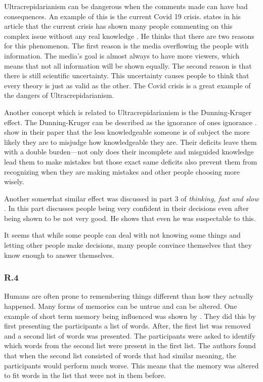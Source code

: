 \documentclass[]{article}
\begin{document}
Ultracrepidarianism can be dangerous when the comments made can have bad consequences.
An example of this is the current Covid 19 crisis. \citeauthor[]{Villain2020} 
states in his article that the current crisis has shown many people commenting 
on this complex issue without any real knowledge \cite{Villain2020}. He thinks 
that there are two reasons for this phenomenon. The first reason is the media
overflowing the people with information. The media's goal is almost always to 
have more viewers, which means that not all information will be shown equally.
The second reason is that there is still scientific uncertainty. This uncertainty
causes people to think that every theory is just as valid as the other. The 
Covid crisis is a great example of the dangers of Ultracrepidarianism.

Another concept which is related to Ultracrepidarianism is the Dunning-Kruger
effect. The Dunning-Kruger can be described as the ignorance of ones 
ignorance \cite{DUNNING2011247}. \citeauthor{DUNNING2011247} show in their paper
that the less knowledgeable someone is of subject the more likely they are to 
misjudge how knowledgeable they are. Their deficits leave them with a double 
burden—not only does their incomplete and misguided knowledge lead them to make 
mistakes but those exact same deficits also prevent them from recognizing when 
they are making mistakes and other people choosing more wisely.

Another somewhat similar effect was discussed in part 3 of \textit{thinking, fast and slow} 
\cite{kahneman2011thinking}. In this part \citeauthor{kahneman2011thinking} 
discusses people being very confident in their decisions even after being 
shown to be not very good. He shows that even he was suspectable to this. 

It seems that while some people can deal with not knowing some things and letting
other people make decisions, many people convince themselves that they know enough
to answer themselves.

\subsubsection*{R.4}
Humans are often prone to remembering things different than how they actually 
happened. Many forms of memories can be untrue and can be altered. One example 
of short term memory being influenced was shown by \citeauthor{lampinen1997memory}
\cite{lampinen1997memory}.
They did this by first presenting the participants a list of words. After, the first list 
was removed and a second list of words was presented. The participants were 
asked to identify which words from the second list were present in the first list.
The authors found that when the second list consisted of words that had similar 
meaning, the participants would perform much worse. This means that the 
memory was altered to fit words in the list that were not in them before.
\end{document}
